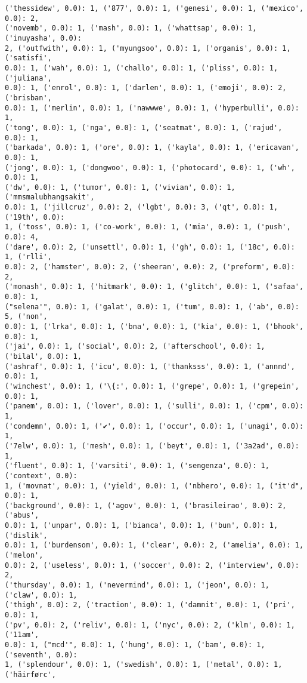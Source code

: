 \documentclass[11pt]{article}
\begin{document}
\begin{Verbatim}[commandchars=\\\{\}]
('thessidew', 0.0): 1, ('877', 0.0): 1, ('genesi', 0.0): 1, ('mexico', 0.0): 2,
('novemb', 0.0): 1, ('mash', 0.0): 1, ('whattsap', 0.0): 1, ('inuyasha', 0.0):
2, ('outfwith', 0.0): 1, ('myungsoo', 0.0): 1, ('organis', 0.0): 1, ('satisfi',
0.0): 1, ('wah', 0.0): 1, ('challo', 0.0): 1, ('pliss', 0.0): 1, ('juliana',
0.0): 1, ('enrol', 0.0): 1, ('darlen', 0.0): 1, ('emoji', 0.0): 2, ('brisban',
0.0): 1, ('merlin', 0.0): 1, ('nawwwe', 0.0): 1, ('hyperbulli', 0.0): 1,
('tong', 0.0): 1, ('nga', 0.0): 1, ('seatmat', 0.0): 1, ('rajud', 0.0): 1,
('barkada', 0.0): 1, ('ore', 0.0): 1, ('kayla', 0.0): 1, ('ericavan', 0.0): 1,
('jong', 0.0): 1, ('dongwoo', 0.0): 1, ('photocard', 0.0): 1, ('wh', 0.0): 1,
('dw', 0.0): 1, ('tumor', 0.0): 1, ('vivian', 0.0): 1, ('mmsmalubhangsakit',
0.0): 1, ('jillcruz', 0.0): 2, ('lgbt', 0.0): 3, ('qt', 0.0): 1, ('19th', 0.0):
1, ('toss', 0.0): 1, ('co-work', 0.0): 1, ('mia', 0.0): 1, ('push', 0.0): 4,
('dare', 0.0): 2, ('unsettl', 0.0): 1, ('gh', 0.0): 1, ('18c', 0.0): 1, ('rlli',
0.0): 2, ('hamster', 0.0): 2, ('sheeran', 0.0): 2, ('preform', 0.0): 2,
('monash', 0.0): 1, ('hitmark', 0.0): 1, ('glitch', 0.0): 1, ('safaa', 0.0): 1,
("selena'", 0.0): 1, ('galat', 0.0): 1, ('tum', 0.0): 1, ('ab', 0.0): 5, ('non',
0.0): 1, ('lrka', 0.0): 1, ('bna', 0.0): 1, ('kia', 0.0): 1, ('bhook', 0.0): 1,
('jai', 0.0): 1, ('social', 0.0): 2, ('afterschool', 0.0): 1, ('bilal', 0.0): 1,
('ashraf', 0.0): 1, ('icu', 0.0): 1, ('thanksss', 0.0): 1, ('annnd', 0.0): 1,
('winchest', 0.0): 1, ('\{:', 0.0): 1, ('grepe', 0.0): 1, ('grepein', 0.0): 1,
('panem', 0.0): 1, ('lover', 0.0): 1, ('sulli', 0.0): 1, ('cpm', 0.0): 1,
('condemn', 0.0): 1, ('✔', 0.0): 1, ('occur', 0.0): 1, ('unagi', 0.0): 1,
('7elw', 0.0): 1, ('mesh', 0.0): 1, ('beyt', 0.0): 1, ('3a2ad', 0.0): 1,
('fluent', 0.0): 1, ('varsiti', 0.0): 1, ('sengenza', 0.0): 1, ('context', 0.0):
1, ('movnat', 0.0): 1, ('yield', 0.0): 1, ('nbhero', 0.0): 1, ("it'd", 0.0): 1,
('background', 0.0): 1, ('agov', 0.0): 1, ('brasileirao', 0.0): 2, ('abus',
0.0): 1, ('unpar', 0.0): 1, ('bianca', 0.0): 1, ('bun', 0.0): 1, ('dislik',
0.0): 1, ('burdensom', 0.0): 1, ('clear', 0.0): 2, ('amelia', 0.0): 1, ('melon',
0.0): 2, ('useless', 0.0): 1, ('soccer', 0.0): 2, ('interview', 0.0): 2,
('thursday', 0.0): 1, ('nevermind', 0.0): 1, ('jeon', 0.0): 1, ('claw', 0.0): 1,
('thigh', 0.0): 2, ('traction', 0.0): 1, ('damnit', 0.0): 1, ('pri', 0.0): 1,
('pv', 0.0): 2, ('reliv', 0.0): 1, ('nyc', 0.0): 2, ('klm', 0.0): 1, ('11am',
0.0): 1, ("mcd'", 0.0): 1, ('hung', 0.0): 1, ('bam', 0.0): 1, ('seventh', 0.0):
1, ('splendour', 0.0): 1, ('swedish', 0.0): 1, ('metal', 0.0): 1, ('häirførc',

\end{Verbatim}
\end{document}
